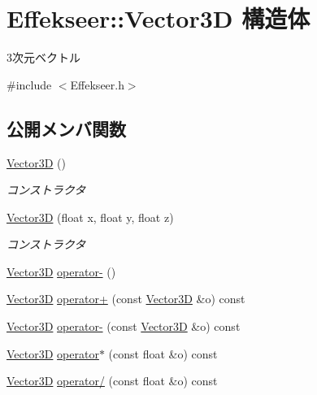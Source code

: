 \hypertarget{struct_effekseer_1_1_vector3_d}{}\section{Effekseer\+:\+:Vector3D 構造体}
\label{struct_effekseer_1_1_vector3_d}


3次元ベクトル  




{\ttfamily \#include $<$Effekseer.\+h$>$}

\subsection*{公開メンバ関数}
\begin{DoxyCompactItemize}
\item 
\mbox{\hyperlink{struct_effekseer_1_1_vector3_d_abf224ea54e943e49876d5d5843693661}{Vector3D}} ()
\begin{DoxyCompactList}\small\item\em コンストラクタ \end{DoxyCompactList}\item 
\mbox{\hyperlink{struct_effekseer_1_1_vector3_d_a304fedc7d4d4140d9e0930f1e9785393}{Vector3D}} (float x, float y, float z)
\begin{DoxyCompactList}\small\item\em コンストラクタ \end{DoxyCompactList}\item 
\mbox{\hyperlink{struct_effekseer_1_1_vector3_d}{Vector3D}} \mbox{\hyperlink{struct_effekseer_1_1_vector3_d_a8e6dda67c91ba45d16bba05fe23bf972}{operator-\/}} ()
\item 
\mbox{\hyperlink{struct_effekseer_1_1_vector3_d}{Vector3D}} \mbox{\hyperlink{struct_effekseer_1_1_vector3_d_ad5b284129380bacd6229d796df3adecb}{operator+}} (const \mbox{\hyperlink{struct_effekseer_1_1_vector3_d}{Vector3D}} \&o) const
\item 
\mbox{\hyperlink{struct_effekseer_1_1_vector3_d}{Vector3D}} \mbox{\hyperlink{struct_effekseer_1_1_vector3_d_ae1da3b63871409cb8bb3e23b4305506d}{operator-\/}} (const \mbox{\hyperlink{struct_effekseer_1_1_vector3_d}{Vector3D}} \&o) const
\item 
\mbox{\hyperlink{struct_effekseer_1_1_vector3_d}{Vector3D}} \mbox{\hyperlink{struct_effekseer_1_1_vector3_d_a95d40548c0aeb66d531d8f0d1e781c5d}{operator$\ast$}} (const float \&o) const
\item 
\mbox{\hyperlink{struct_effekseer_1_1_vector3_d}{Vector3D}} \mbox{\hyperlink{struct_effekseer_1_1_vector3_d_ad6ee55218a4aa3836fa9c937eb976131}{operator/}} (const float \&o) const

\end{DoxyCompactItemize}
